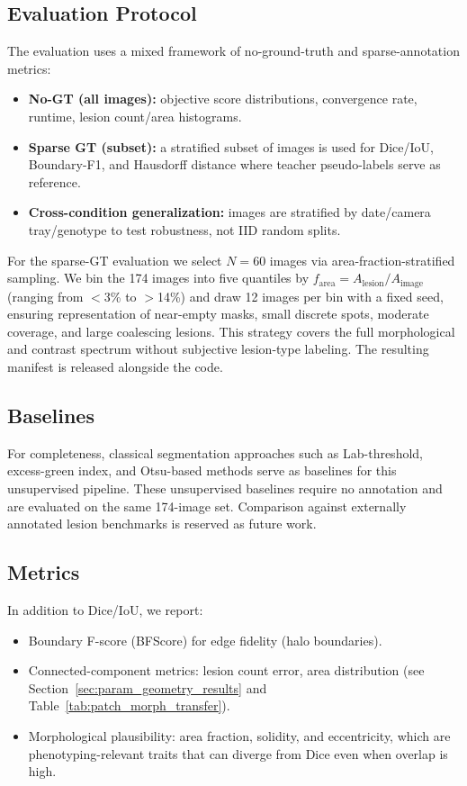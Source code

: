 \documentclass[11pt,a4paper]{article}
\begin{document}
\subsection{Evaluation Protocol}
The evaluation uses a mixed framework of no-ground-truth and sparse-annotation metrics:
\begin{itemize}
    \item \textbf{No-GT (all images):} objective score distributions, convergence rate, runtime, lesion count/area histograms.
    \item \textbf{Sparse GT (subset):} a stratified subset of images is used for Dice/IoU, Boundary-F1, and Hausdorff distance where teacher pseudo-labels serve as reference.
    \item \textbf{Cross-condition generalization:} images are stratified by date/camera tray/genotype to test robustness, not IID random splits.
\end{itemize}
For the sparse-GT evaluation we select $N{=}60$ images via area-fraction-stratified sampling. We bin the 174 images into five quantiles by $f_{\mathrm{area}} = A_{\mathrm{lesion}}/A_{\mathrm{image}}$ (ranging from $<$3\% to $>$14\%) and draw 12 images per bin with a fixed seed, ensuring representation of near-empty masks, small discrete spots, moderate coverage, and large coalescing lesions. This strategy covers the full morphological and contrast spectrum without subjective lesion-type labeling. The resulting manifest is released alongside the code.

\subsection{Baselines}
For completeness, classical segmentation approaches such as Lab-threshold, excess-green index, and Otsu-based methods serve as baselines for this unsupervised pipeline. These unsupervised baselines require no annotation and are evaluated on the same 174-image set. Comparison against externally annotated lesion benchmarks is reserved as future work.

\subsection{Metrics}
In addition to Dice/IoU, we report:
\begin{itemize}
    \item Boundary F-score (BFScore) for edge fidelity (halo boundaries).
    \item Connected-component metrics: lesion count error, area distribution (see Section~\ref{sec:param_geometry_results} and Table~\ref{tab:patch_morph_transfer}).
    \item Morphological plausibility: area fraction, solidity, and eccentricity, which are phenotyping-relevant traits that can diverge from Dice even when overlap is high.
\end{itemize}
\end{document}
